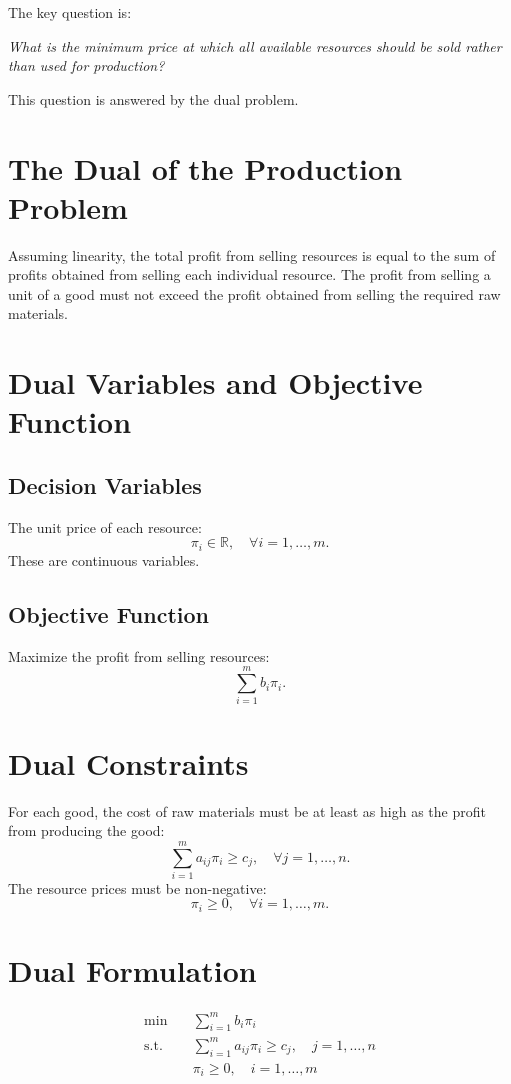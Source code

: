 \documentclass[a4paper, 11pt]{article}
\begin{document}
The key question is:

\textit{What is the minimum price at which all available resources should be sold rather than used for production?}

This question is answered by the dual problem.

\section{The Dual of the Production Problem}

Assuming linearity, the total profit from selling resources is equal to the sum of profits obtained from selling each individual resource. The profit from selling a unit of a good must not exceed the profit obtained from selling the required raw materials.

\section{Dual Variables and Objective Function}

\subsection{Decision Variables}
The unit price of each resource:
\[ \pi_{i} \in \mathbb{R}, \quad \forall i = 1, \dots, m. \]
These are continuous variables.

\subsection{Objective Function}
Maximize the profit from selling resources:
\[ \sum_{i=1}^{m} b_{i} \pi_{i}. \]

\section{Dual Constraints}
For each good, the cost of raw materials must be at least as high as the profit from producing the good:
\[ \sum_{i=1}^{m} a_{ij} \pi_{i} \geq c_{j}, \quad \forall j=1,\dots,n. \]
The resource prices must be non-negative:
\[ \pi_{i} \geq 0, \quad \forall i=1,\dots,m. \]

\section{Dual Formulation}

\begin{align*}
\min & \quad \sum_{i=1}^{m} b_{i} \pi_{i} \\
\text{s.t.} & \quad \sum_{i=1}^{m} a_{ij} \pi_{i} \geq c_{j}, \quad j=1,\dots,n \\
& \quad \pi_{i} \geq 0, \quad i=1,\dots,m
\end{align*}
\end{document}
